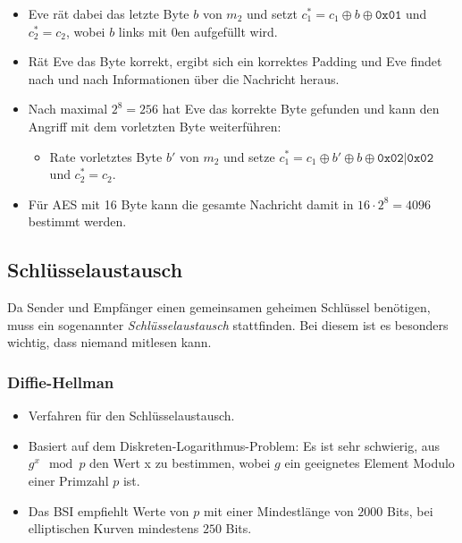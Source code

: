 \documentclass[a4paper, 11pt, accentcolor = tud3b]{tudreport}
\begin{document}
		                    \begin{itemize}
		                    	\item Eve rät dabei das letzte Byte \(b\) von \(m_2\) und setzt \( c_1^* = c_1 \oplus b \oplus \texttt{0x01} \) und \( c_2^* = c_2 \), wobei \(b\) links mit \(0\)en aufgefüllt wird.
		                    	\item Rät Eve das Byte korrekt, ergibt sich ein korrektes Padding und Eve findet nach und nach Informationen über die Nachricht heraus.
		                    	\item Nach maximal \( 2^8 = 256 \) hat Eve das korrekte Byte gefunden und kann den Angriff mit dem vorletzten Byte weiterführen:
			                    	\begin{itemize}
			                    		\item Rate vorletztes Byte \(b'\) von \(m_2\) und setze \(c_1^* = c_1 \oplus b' \oplus b \oplus \texttt{0x02} \vert \texttt{0x02} \) und \(c_2^* = c_2\).
			                    	\end{itemize}
			                    \item Für AES mit 16 Byte kann die gesamte Nachricht damit in \( 16 \cdot 2^8 = 4096 \) bestimmt werden.
		                    \end{itemize}
            
            \subsection{Schlüsselaustausch}
	            Da Sender und Empfänger einen gemeinsamen geheimen Schlüssel benötigen, muss ein sogenannter \textit{Schlüsselaustausch} stattfinden. Bei diesem ist es besonders wichtig, dass niemand mitlesen kann.
	            
	            \subsubsection{Diffie-Hellman}
		            \begin{itemize}
		            	\item Verfahren für den Schlüsselaustausch.
		            	\item Basiert auf dem Diskreten-Logarithmus-Problem: Es ist sehr schwierig, aus \( g ^ x \mod p \) den Wert x zu bestimmen, wobei \(g\) ein geeignetes Element Modulo einer Primzahl \(p\) ist.
		            	\item Das BSI empfiehlt Werte von \(p\) mit einer Mindestlänge von \(2000\) Bits, bei elliptischen Kurven mindestens \(250\) Bits.
		            \end{itemize}
	            
\end{document}
